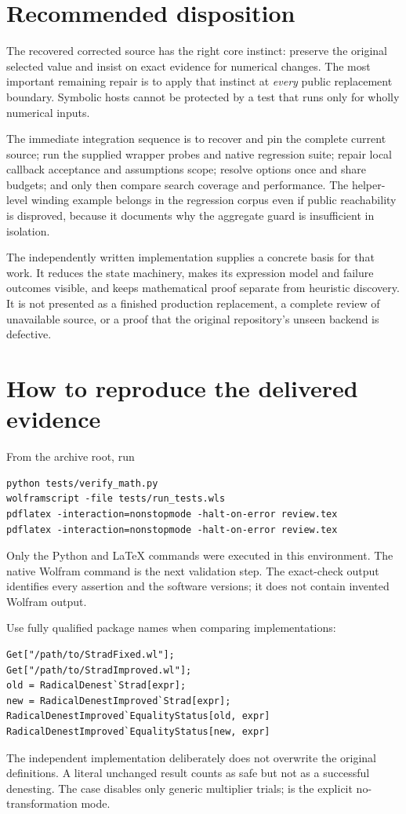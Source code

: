 \documentclass[11pt,letterpaper]{article}
\numberwithin{equation}{section}
\theoremstyle{definition}\newtheorem{definition}[theorem]{Definition}
\theoremstyle{remark}\newtheorem{remark}[theorem]{Remark}
\newcommand{\code}[1]{\texttt{\detokenize{#1}}}
\begin{document}
\section{Recommended disposition}
The recovered corrected source has the right core instinct: preserve the original selected value and insist on exact evidence for numerical changes. The most important remaining repair is to apply that instinct at \emph{every} public replacement boundary. Symbolic hosts cannot be protected by a test that runs only for wholly numerical inputs.

The immediate integration sequence is to recover and pin the complete current source; run the supplied wrapper probes and native regression suite; repair local callback acceptance and assumptions scope; resolve options once and share budgets; and only then compare search coverage and performance. The helper-level winding example belongs in the regression corpus even if public reachability is disproved, because it documents why the aggregate guard is insufficient in isolation.

The independently written implementation supplies a concrete basis for that work. It reduces the state machinery, makes its expression model and failure outcomes visible, and keeps mathematical proof separate from heuristic discovery. It is not presented as a finished production replacement, a complete review of unavailable source, or a proof that the original repository's unseen backend is defective.

\appendix
\section{How to reproduce the delivered evidence}
From the archive root, run
\begin{lstlisting}[language={}]
python tests/verify_math.py
wolframscript -file tests/run_tests.wls
pdflatex -interaction=nonstopmode -halt-on-error review.tex
pdflatex -interaction=nonstopmode -halt-on-error review.tex
\end{lstlisting}
Only the Python and LaTeX commands were executed in this environment. The native Wolfram command is the next validation step. The exact-check output identifies every assertion and the software versions; it does not contain invented Wolfram output.

Use fully qualified package names when comparing implementations:
\begin{lstlisting}
Get["/path/to/StradFixed.wl"];
Get["/path/to/StradImproved.wl"];
old = RadicalDenest`Strad[expr];
new = RadicalDenestImproved`Strad[expr];
RadicalDenestImproved`EqualityStatus[old, expr]
RadicalDenestImproved`EqualityStatus[new, expr]
\end{lstlisting}
The independent implementation deliberately does not overwrite the original definitions. A literal unchanged result counts as safe but not as a successful denesting. The case \code{"MaxTrials" -> 0} disables only generic multiplier trials; \code{"TimeBudget" -> 0} is the explicit no-transformation mode.
\end{document}
